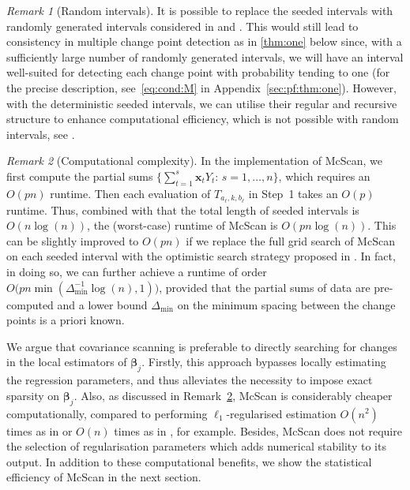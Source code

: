 \documentclass[11pt, a4paper]{article}
\newcommand{\mbf}{\mathbf}
\theoremstyle{definition}
\theoremstyle{definition}
\theoremstyle{definition}
\theoremstyle{definition}
\theoremstyle{definition}
\theoremstyle{remark}
\newtheorem{rem}{Remark}[section]
\theoremstyle{definition}
\theoremstyle{definition}
\theoremstyle{definition}
\begin{document}
\begin{rem}[Random intervals]
	It is possible to replace the seeded intervals with randomly generated intervals considered in \citet{fryzlewicz2014wild} and \citet{baranowski2019narrowest}. 
	This would still lead to consistency in multiple change point detection as in \cref{thm:one} below since, with a sufficiently large number of randomly generated intervals, we will have an interval well-suited for detecting each change point with probability tending to one (for the precise description, see~\eqref{eq:cond:M} in Appendix~\ref{sec:pf:thm:one}). However, with the deterministic seeded intervals, we can utilise their regular and recursive structure to enhance computational efficiency, which is not possible with random intervals, see \citet{kovacs2020seeded}. 
\end{rem}

\begin{rem}[Computational complexity]
	\label{rem:comp}
	In the implementation of McScan, we first compute the partial sums $\{\sum_{t= 1}^s\mbf x_t Y_t : \,  s = 1, \ldots, n\}$, which requires an $O(pn)$ runtime. Then each evaluation of $T_{a_\ell, k, b_\ell}$ in Step~1 takes an $O(p)$ runtime. Thus, combined with that the total length of seeded intervals is $O(n\log(n))$, the (worst-case) runtime of McScan is $O(pn\log(n))$. This can be slightly improved to $O(pn)$ if we replace the full grid search of McScan on each seeded interval with the optimistic search strategy proposed in \citet{kovacs2020optimistic}. In fact, in doing so, we can further achieve a runtime of order $O\big( pn \min(\Delta_{\min}^{-1} \log(n), 1) \big)$, provided that the partial sums of data are pre-computed and a lower bound $\Delta_{\min}$ on the minimum spacing between the change points is a priori known.
\end{rem}

We argue that covariance scanning is preferable to directly searching for changes in the local estimators of $\bm\beta_j$.
Firstly, this approach bypasses locally estimating the regression parameters, and thus alleviates the necessity to impose exact sparsity on $\bm\beta_j$.
Also, as discussed in Remark~\ref{rem:comp}, McScan is considerably cheaper computationally, compared to performing $\ell_1$-regularised estimation $O(n^2)$ times as in \cite{xu2022change} or $O(n)$ times as in \cite{cho2022high}, for example. 
Besides, McScan does not require the selection of regularisation parameters which adds numerical stability to its output. 
In addition to these computational benefits, 
we show the statistical efficiency of McScan in the next section.
\end{document}
